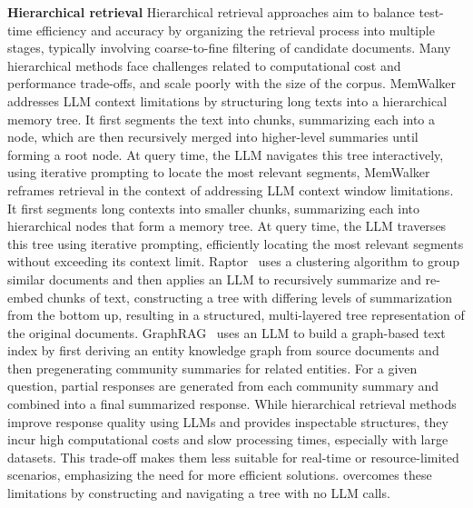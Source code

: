 \noindent\textbf{Hierarchical retrieval}
Hierarchical retrieval approaches aim to balance test-time efficiency and accuracy by organizing the retrieval process into multiple stages, typically involving coarse-to-fine filtering of candidate documents.
Many hierarchical methods face challenges related to computational cost and performance trade-offs, and scale poorly with the size of the corpus.
MemWalker~\cite{chen2023walking} addresses LLM context limitations by structuring long texts into a hierarchical memory tree. It first segments the text into chunks, summarizing each into a node, which are then recursively merged into higher-level summaries until forming a root node. At query time, the LLM navigates this tree interactively, using iterative prompting to locate the most relevant segments, 
%
MemWalker~\cite{chen2023walking} reframes retrieval in the context of addressing LLM context window limitations. It first segments long contexts into smaller chunks, summarizing each into hierarchical nodes that form a memory tree. At query time, the LLM traverses this tree using iterative prompting, efficiently locating the most relevant segments without exceeding its context limit.
Raptor~\cite{sarthi2024raptor} uses a clustering algorithm to group similar documents and then applies an LLM to recursively summarize and re-embed chunks of text, constructing a tree with differing levels of summarization from the bottom up, resulting in a structured, multi-layered tree representation of the original documents. 
GraphRAG~\cite{edge2024local} uses an LLM to build a graph-based text index by first deriving an entity knowledge graph from source documents and then pregenerating community summaries for related entities. For a given question, partial responses are generated from each community summary and combined into a final summarized response.
%
While hierarchical retrieval methods improve response quality using LLMs and provides inspectable structures, they incur high computational costs and slow processing times, especially with large datasets. This trade-off makes them less suitable for real-time or resource-limited scenarios, emphasizing the need for more efficient solutions.
\ourmodel{} overcomes these limitations by constructing and navigating a tree with no LLM calls. 

